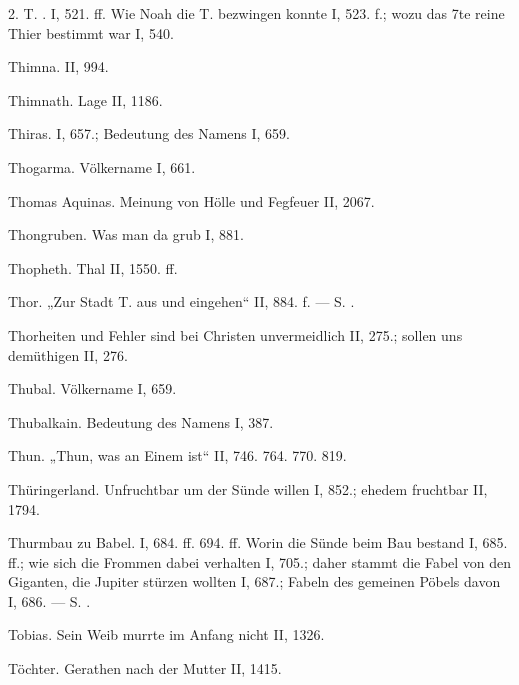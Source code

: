 2.  T. . I, 521. ff. Wie Noah die T. bezwingen konnte I, 523. f.; wozu das 7te reine Thier bestimmt war I, 540.

Thimna. II, 994.

Thimnath. Lage II, 1186.

Thiras. I, 657.; Bedeutung des Namens I, 659.

Thogarma. Völkername I, 661.

Thomas Aquinas. Meinung von Hölle und Fegfeuer II, 2067.

Thongruben. Was man da grub I, 881.

Thopheth. Thal II, 1550. ff.

Thor. „Zur Stadt T. aus und eingehen“ II, 884. f. — S. .

Thorheiten und Fehler sind bei Christen unvermeidlich II, 275.; sollen uns demüthigen II, 276.

Thubal. Völkername I, 659.

Thubalkain. Bedeutung des Namens I, 387.

Thun. „Thun, was an Einem ist“ II, 746. 764. 770. 819.

Thüringerland. Unfruchtbar um der Sünde willen I, 852.; ehedem fruchtbar II, 1794.

Thurmbau zu Babel. I, 684. ff. 694. ff. Worin die Sünde beim Bau bestand I, 685. ff.; wie sich die Frommen dabei verhalten I, 705.; daher stammt die Fabel von den Giganten, die Jupiter stürzen wollten I, 687.; Fabeln des gemeinen Pöbels davon I, 686. — S. .

Tobias. Sein Weib murrte im Anfang nicht II, 1326.

Töchter. Gerathen nach der Mutter II, 1415.

